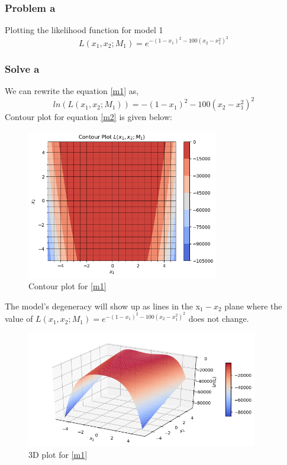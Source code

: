 \documentclass{article}
\begin{document}
\subsubsection*{Problem a}
Plotting the likelihood function for model 1
\begin{equation}
    L(x_1,x_2;M_1) = e^{-(1-x_1)^2 - 100(x_2-x_1^2)^2}
    \label{m1}
\end{equation}
\subsubsection*{Solve a} 
We can rewrite the equation \ref{m1} as,
\begin{equation}
    ln(L(x_1,x_2;M_1)) = -(1-x_1)^2 - 100(x_2-x_1^2)^2
    \label{m2}
\end{equation}
Contour plot for equation \ref{m2} is given below:
\begin{figure}[h!]
  \centering
    \includegraphics[width=0.75\textwidth]{Contour_plot.png}
    \caption{Contour plot for \ref{m1}} 
    \label{contour}
\end{figure}
The model’s degeneracy will show up as lines
in the x$_1-x_2$ plane where the value of $ L(x_1,x_2;M_1) = e^{-(1-x_1)^2 - 100(x_2-x_1^2)^2}$ does not change.
\begin{figure}[h!]
  \centering
    \includegraphics[width=0.9\textwidth]{Contour_plot_3d.png}
    \caption{3D plot for \ref{m1}} 
    \label{contour}
\end{figure}
\end{document}
